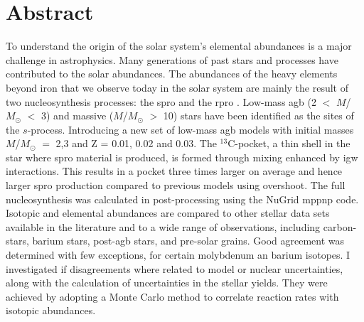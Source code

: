 \chapter{Abstract}

To understand the origin of the solar system's elemental abundances is a major challenge in astrophysics. Many generations of past stars and processes have contributed to the solar abundances. The abundances of the heavy elements beyond iron that we observe today in the solar system are mainly the result of two nucleosynthesis processes: the \acrfull{spro} and the \acrfull{rpro} . Low-mass \acrfull{agb} (2 $<$ $M$/$M_\odot$ $<$ 3) and massive ($M$/$M_\odot$ $>$ 10) stars have been identified as the sites of the $s$-process. Introducing a new set of low-mass \acrshort{agb} models with initial masses $M$/$M_\odot$ $=$ 2,3 and Z = 0.01, 0.02 and 0.03. The $^{13}$C-pocket, a thin shell in the star where \acrshort{spro} material is produced, is formed through mixing enhanced by \acrfull{igw} interactions. This results in a pocket three times larger on average and hence larger \acrshort{spro} production compared to previous models using overshoot. The full nucleosynthesis was calculated in post-processing using the NuGrid mppnp code. Isotopic and elemental abundances are compared to other stellar data sets available in the literature and to a wide range of observations, including carbon-stars, barium stars, post-\acrshort{agb} stars, and pre-solar grains. Good agreement was determined with few exceptions, for certain molybdenum an barium isotopes. I investigated if disagreements where related to model or nuclear uncertainties, along with the calculation of uncertainties in the stellar yields. They were achieved by adopting a Monte Carlo method to correlate reaction rates with isotopic abundances.